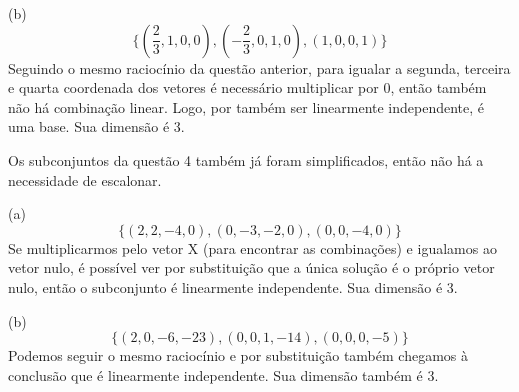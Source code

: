 \documentclass{homework}
\begin{document}
(b)
\[\{(\frac{2}{3},1,0,0),(-\frac{2}{3},0,1,0),(1,0,0,1)\}\]
Seguindo o mesmo raciocínio da questão anterior, para igualar a segunda, terceira e quarta coordenada dos vetores é necessário multiplicar por 0, então também não há combinação linear. Logo, por também ser linearmente independente, é uma base. Sua dimensão é 3.

\exercise*
Os subconjuntos da questão 4 também já foram simplificados, então não há a necessidade de escalonar.

(a)
\[\{(2,2,-4,0),(0,-3,-2,0),(0,0,-4,0)\}\]
Se multiplicarmos pelo vetor X (para encontrar as combinações) e igualamos ao vetor nulo, é possível ver por substituição que a única solução é o próprio vetor nulo, então o subconjunto é linearmente independente. Sua dimensão é 3.

(b)
\[\{(2,0,-6,-23),(0,0,1,-14),(0,0,0,-5)\}\]
Podemos seguir o mesmo raciocínio e por substituição também chegamos à conclusão que é linearmente independente. Sua dimensão também é 3.
\end{document}
